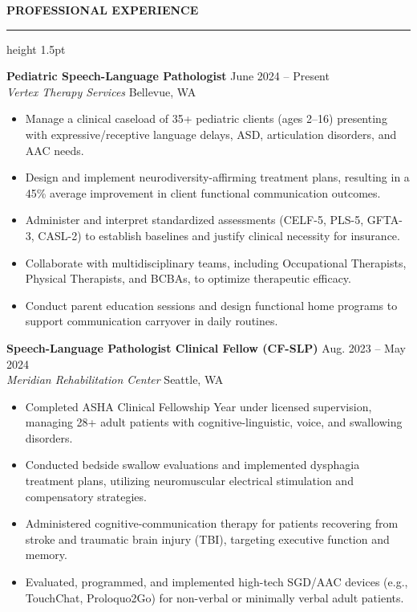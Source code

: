\documentclass[10pt]{article}
\newcommand{\cvsection}[1]{%
  \vspace{10pt}%
  {\color{primary}\large\bfseries\MakeUppercase{#1}}%
  \vspace{3pt}%
  {\color{primary}\hrule height 1.5pt}%
  \vspace{6pt}%
}
\newcommand{\jobentry}[4]{%
  {\textbf{#1}} \hfill {\color{secondary}\small #3} \\
  {\color{secondary}\itshape #2} \hfill {\color{secondary}\small #4} \\
  \vspace{2pt}
}
\begin{document}
\begin{minipage}[t]{0.62\textwidth}
  \cvsection{Professional Experience}
  
  \jobentry{Pediatric Speech-Language Pathologist}{Vertex Therapy Services}{June 2024 -- Present}{Bellevue, WA}
  \begin{itemize}
    \item Manage a clinical caseload of 35+ pediatric clients (ages 2--16) presenting with expressive/receptive language delays, ASD, articulation disorders, and AAC needs.
    \item Design and implement neurodiversity-affirming treatment plans, resulting in a 45\% average improvement in client functional communication outcomes.
    \item Administer and interpret standardized assessments (CELF-5, PLS-5, GFTA-3, CASL-2) to establish baselines and justify clinical necessity for insurance.
    \item Collaborate with multidisciplinary teams, including Occupational Therapists, Physical Therapists, and BCBAs, to optimize therapeutic efficacy.
    \item Conduct parent education sessions and design functional home programs to support communication carryover in daily routines.
  \end{itemize}
  
  \vspace{8pt}
  
  \jobentry{Speech-Language Pathologist Clinical Fellow (CF-SLP)}{Meridian Rehabilitation Center}{Aug. 2023 -- May 2024}{Seattle, WA}
  \begin{itemize}
    \item Completed ASHA Clinical Fellowship Year under licensed supervision, managing 28+ adult patients with cognitive-linguistic, voice, and swallowing disorders.
    \item Conducted bedside swallow evaluations and implemented dysphagia treatment plans, utilizing neuromuscular electrical stimulation and compensatory strategies.
    \item Administered cognitive-communication therapy for patients recovering from stroke and traumatic brain injury (TBI), targeting executive function and memory.
    \item Evaluated, programmed, and implemented high-tech SGD/AAC devices (e.g., TouchChat, Proloquo2Go) for non-verbal or minimally verbal adult patients.
  \end{itemize}
  

\end{minipage}
\end{document}
